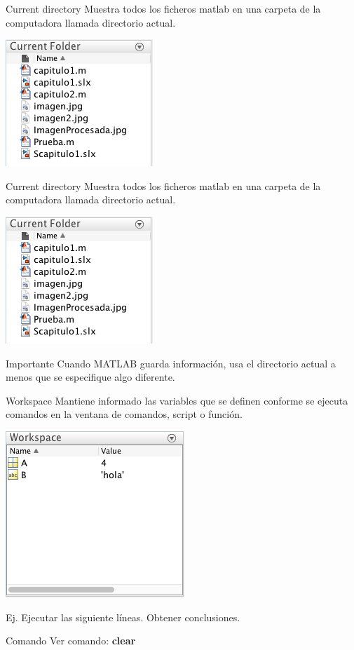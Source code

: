 \documentclass{bredelebeamer}
\begin{document}
\begin{frame}{Current directory}
Muestra todos los ficheros matlab en una carpeta de la computadora llamada directorio actual.
\begin{center}
\includegraphics[scale=0.3]{images/pantalla4.png}
\end{center}
\end{frame}

\begin{frame}{Current directory}
Muestra todos los ficheros matlab en una carpeta de la computadora llamada directorio actual.
\begin{center}
\includegraphics[scale=0.3]{images/pantalla4.png}
\end{center}
\begin{alertblock}{Importante}
Cuando MATLAB guarda información, usa el directorio actual a menos que se especifique algo diferente.
\end{alertblock}
\end{frame}

\begin{frame}{Workspace}
Mantiene informado las variables que se definen conforme se ejecuta comandos en la ventana de comandos, script o función.
\begin{center}
\includegraphics[scale=0.3]{images/pantalla5.png}
\end{center}
Ej. Ejecutar las siguiente líneas. Obtener conclusiones.
\begin{exampleblock}{Comando}
Ver comando: \textbf{clear}
\end{exampleblock}
\end{frame}
\end{document}

